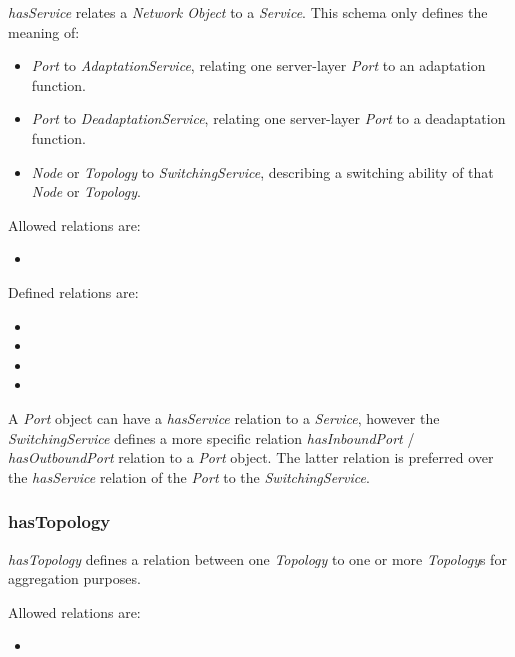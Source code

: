 \emph{hasService} relates a \emph{Network Object} to a \emph{Service}. This schema only defines the meaning of:
    \begin{itemize}
        \item \emph{Port} to \emph{AdaptationService}, relating one server-layer \emph{Port} to an adaptation function.
        \item \emph{Port} to \emph{DeadaptationService}, relating one server-layer \emph{Port} to a deadaptation function.
        \item \emph{Node} or \emph{Topology} to \emph{SwitchingService}, describing a switching ability of that \emph{Node} or \emph{Topology}.
    \end{itemize}

Allowed relations are:
\begin{itemize}
    \item {}
\end{itemize}

Defined relations are:
\begin{itemize}
    \item {}
    \item {}
    \item {}
    \item {}
\end{itemize}

A \emph{Port} object can have a \emph{hasService} relation to a \emph{Service}, however the \emph{SwitchingService} defines a more specific relation \emph{hasInboundPort} / \emph{hasOutboundPort} relation to a \emph{Port} object. The latter relation is preferred over the \emph{hasService} relation of the \emph{Port} to the \emph{SwitchingService}.


\subsubsection{hasTopology}%
\label{rel:hasTopology}

\emph{hasTopology} defines a relation between one \emph{Topology} to one or more \emph{Topology}s for aggregation purposes.

Allowed relations are:
\begin{itemize}
    \item {}
\end{itemize}


